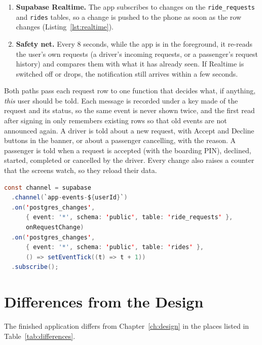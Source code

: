 \begin{enumerate}
  \item \textbf{Supabase Realtime.} The app subscribes to changes on the \texttt{ride\_requests} and \texttt{rides} tables, so a change is pushed to the phone as soon as the row changes (Listing~\ref{lst:realtime}).
  \item \textbf{Safety net.} Every 8 seconds, while the app is in the foreground, it re-reads the user's own requests (a driver's incoming requests, or a passenger's request history) and compares them with what it has already seen. If Realtime is switched off or drops, the notification still arrives within a few seconds.
\end{enumerate}
 
Both paths pass each request row to one function that decides what, if anything, \emph{this} user should be told. Each message is recorded under a key made of the request and its status, so the same event is never shown twice, and the first read after signing in only remembers existing rows so that old events are not announced again. A driver is told about a new request, with Accept and Decline buttons in the banner, or about a passenger cancelling, with the reason. A passenger is told when a request is accepted (with the boarding PIN), declined, started, completed or cancelled by the driver. Every change also raises a counter that the screens watch, so they reload their data.
 
\begin{lstlisting}[language=Java,caption={Subscribing to live changes},label={lst:realtime}]
const channel = supabase
  .channel(`app-events-${userId}`)
  .on('postgres_changes',
      { event: '*', schema: 'public', table: 'ride_requests' },
      onRequestChange)
  .on('postgres_changes',
      { event: '*', schema: 'public', table: 'rides' },
      () => setEventTick((t) => t + 1))
  .subscribe();
\end{lstlisting}
 
\section{Differences from the Design}
 
The finished application differs from Chapter~\ref{ch:design} in the places listed in Table~\ref{tab:differences}.
 
